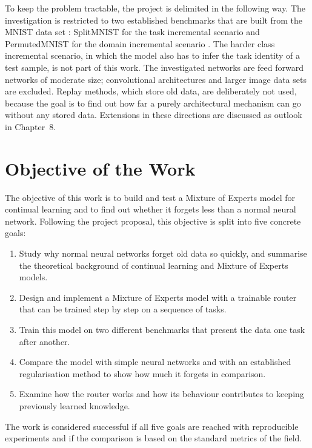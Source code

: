 To keep the problem tractable, the project is delimited in the following
way. The investigation is restricted to two established benchmarks that are
built from the MNIST data set \cite{lecun1998}: SplitMNIST for the task
incremental scenario and PermutedMNIST for the domain incremental scenario
\cite{vandeven2019}. The harder class incremental scenario, in which the
model also has to infer the task identity of a test sample, is not part of
this work. The investigated networks are feed forward networks of moderate
size; convolutional architectures and larger image data sets are excluded.
Replay methods, which store old data, are deliberately not used, because
the goal is to find out how far a purely architectural mechanism can go
without any stored data. Extensions in these directions are discussed as
outlook in Chapter~8.

\section{Objective of the Work}
\label{sec:objective}

The objective of this work is to build and test a Mixture of Experts model
for continual learning and to find out whether it forgets less than a
normal neural network. Following the project proposal, this objective is
split into five concrete goals:

\begin{enumerate}[label=\textbf{G\arabic*.}, leftmargin=3em]
  \item Study why normal neural networks forget old data so quickly, and
        summarise the theoretical background of continual learning and
        Mixture of Experts models.
  \item Design and implement a Mixture of Experts model with a trainable
        router that can be trained step by step on a sequence of tasks.
  \item Train this model on two different benchmarks that present the data
        one task after another.
  \item Compare the model with simple neural networks and with an
        established regularisation method to show how much it forgets in
        comparison.
  \item Examine how the router works and how its behaviour contributes to
        keeping previously learned knowledge.
\end{enumerate}

The work is considered successful if all five goals are reached with
reproducible experiments and if the comparison is based on the standard
metrics of the field.

